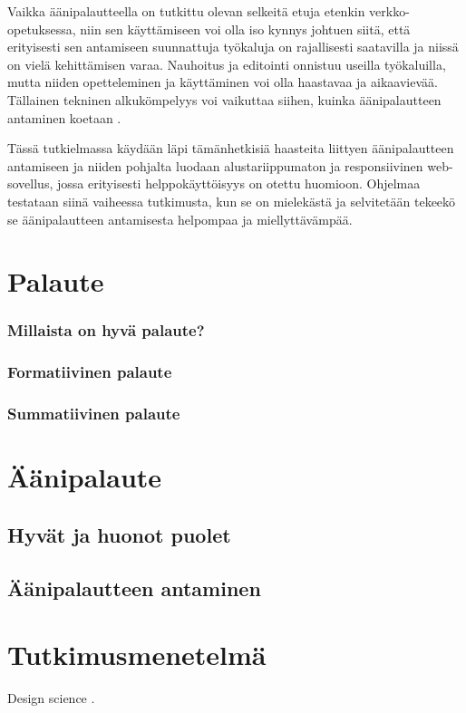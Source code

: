 \documentclass[utf8]{gradu3}
\begin{document}
Vaikka äänipalautteella on tutkittu olevan selkeitä etuja etenkin verkko-opetuksessa, niin sen käyttämiseen voi olla iso kynnys johtuen siitä, että erityisesti sen antamiseen suunnattuja työkaluja on rajallisesti saatavilla ja niissä on vielä kehittämisen varaa. Nauhoitus ja editointi onnistuu useilla työkaluilla, mutta niiden opetteleminen ja käyttäminen voi olla haastavaa ja aikaavievää. Tällainen tekninen alkukömpelyys voi vaikuttaa siihen, kuinka äänipalautteen antaminen koetaan \parencite[][]{cavanaugh2014}.

Tässä tutkielmassa käydään läpi tämänhetkisiä haasteita liittyen äänipalautteen antamiseen ja niiden pohjalta luodaan alustariippumaton ja responsiivinen web-sovellus, jossa erityisesti helppokäyttöisyys on otettu huomioon. Ohjelmaa testataan siinä vaiheessa tutkimusta, kun se on mielekästä ja selvitetään tekeekö se äänipalautteen antamisesta helpompaa ja miellyttävämpää.

\chapter{Palaute}
\subsection{Millaista on hyvä palaute?}
\subsection{Formatiivinen palaute}
\subsection{Summatiivinen palaute}

%

\chapter{Äänipalaute}

\section{Hyvät ja huonot puolet}

\section{Äänipalautteen antaminen}


%

\chapter{Tutkimusmenetelmä}
Design science \parencite[][]{design}.
%
\end{document}
